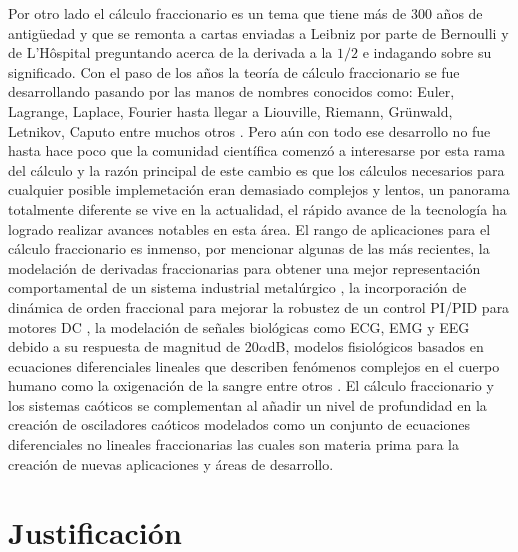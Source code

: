 	Por otro lado el cálculo fraccionario es un tema que tiene más de 300 años de antigüedad y que se remonta a cartas enviadas a Leibniz por parte de Bernoulli y de L'Hôspital preguntando acerca de la derivada a la $1/2$ e indagando sobre su significado. Con el paso de los años la teoría de cálculo fraccionario se fue desarrollando pasando por las manos de nombres conocidos como: Euler, Lagrange, Laplace, Fourier hasta llegar a Liouville, Riemann, Grünwald, Letnikov, Caputo entre muchos otros \cite{Petras2011}. Pero aún con todo ese desarrollo no fue hasta hace poco que la comunidad científica comenzó a interesarse por esta rama del cálculo y la razón principal de este cambio es que los cálculos necesarios para cualquier posible implemetación eran demasiado complejos y lentos, un panorama totalmente diferente se vive en la actualidad, el rápido avance de la tecnología ha logrado realizar avances notables en esta área. El rango de aplicaciones para el cálculo fraccionario es inmenso, por mencionar algunas de las más recientes, la modelación de derivadas fraccionarias para obtener una mejor representación comportamental de un sistema industrial metalúrgico \cite{Petras2019}, la incorporación de dinámica de orden fraccional para mejorar la robustez de un control PI/PID para motores DC \cite{Tepljakov2016,Khubalkar2018}, la modelación de señales biológicas como ECG, EMG y EEG debido a su respuesta de magnitud de 20$\alpha$dB, modelos fisiológicos basados en ecuaciones diferenciales lineales que describen fenómenos complejos en el cuerpo humano como la oxigenación de la sangre entre otros \cite{Ortigueira2011}.
	El cálculo fraccionario y los sistemas caóticos se complementan al añadir un nivel de profundidad en la creación de osciladores caóticos modelados como un conjunto de ecuaciones diferenciales no lineales fraccionarias las cuales son materia prima para la creación de nuevas aplicaciones y áreas de desarrollo. 
	
	\section{Justificación}
	
